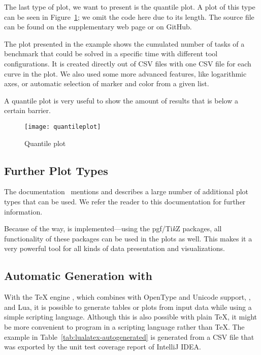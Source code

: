 The last type of plot, we want to present is the quantile plot.  A plot of this
type can be seen in Figure~\ref{fig:quantileplot}; we omit the code here due to
its length.  The source file can be found on the supplementary web page or on
GitHub.

The plot presented in the example shows the cumulated number of tasks of a
benchmark that could be solved in a specific time with different tool
configurations.  It is created directly out of CSV files with one CSV file for
each curve in the plot.  We also used some more advanced features, like
logarithmic axes, or automatic selection of marker and color from a given list.

A quantile plot is very useful to show the amount of results that is below a
certain barrier.

\begin{figure}[!t]
  \centering
  \texttt{[image: quantileplot]}
  \caption{Quantile plot}
  \label{fig:quantileplot}
\end{figure}

\subsection{Further Plot Types}

The  documentation~\cite{Feuersaenger2016} mentions and
describes a large number of additional plot types that can be used.  We refer
the reader to this documentation for further information.

Because of the way,  is implemented—using the
\textsf{pgf/Ti\emph{k}Z} packages, all functionality of these packages can be
used in the plots as well.  This makes it a very powerful tool for all kinds of
data presentation and visualizations.

\subsection{Automatic Generation with }

With the \TeX{} engine , which combines  with
OpenType and Unicode support, , and Lua, it is possible to
generate tables or plots from input data while using a simple scripting
language.  Although this is also possible with plain \TeX{}, it might be more
convenient to program in a scripting language rather than \TeX{}.  The example
in Table~\ref{tab:lualatex-autogenerated} is generated from a CSV file that was
exported by the unit test coverage report of IntelliJ IDEA.

